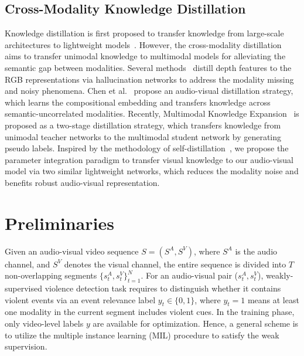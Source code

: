 \documentclass[sigconf]{acmart}
\begin{document}
\subsection{Cross-Modality Knowledge Distillation} 
Knowledge distillation is first proposed to transfer knowledge from large-scale architectures to lightweight models~\cite{hinton2015distilling, bucilu2006model}. However, the cross-modality distillation aims to transfer unimodal knowledge to multimodal models for alleviating the semantic gap between modalities. Several methods~\cite{garcia2018modality, hoffman2016learning} distill depth features to the RGB representations via hallucination networks to address the modality missing and noisy phenomena. Chen et al.~\cite{chen2021distilling} propose an audio-visual distillation strategy, which learns the compositional embedding and transfers knowledge across semantic-uncorrelated modalities. Recently, Multimodal Knowledge Expansion~\cite{xue2021multimodal} is proposed as a two-stage distillation strategy, which transfers knowledge from unimodal teacher networks to the multimodal student network by generating pseudo labels. Inspired by the methodology of self-distillation~\cite{fang2021seed, caron2021emerging, chen2020big, xie2020self, tian2019contrastive1, chen2021wasserstein}, we propose the parameter integration paradigm to transfer visual knowledge to our audio-visual model via two similar lightweight networks, which reduces the modality noise and benefits robust audio-visual representation.

\section{Preliminaries}

Given an audio-visual video sequence $S = (S^A, S^V)$, where $S^A$ is the audio channel, and $S^V$ denotes the visual channel, the entire sequence is divided into $T$ non-overlapping segments $\{s_t^A, s_t^V\}_{t=1}^N$. For an audio-visual pair ($s_t^A, s_t^V$), weakly-supervised violence detection task requires to distinguish whether it contains violent events via an event relevance label $y_t \in \{0, 1\}$, where $y_t = 1$ means at least one modality in the current segment includes violent cues. In the training phase, only video-level labels $y$ are available for optimization. Hence, a general scheme is to utilize the multiple instance learning (MIL) procedure to satisfy the weak supervision.
\end{document}
